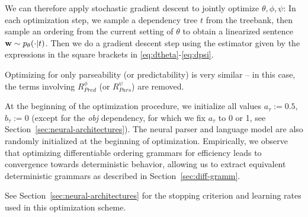 \documentclass[10pt,twoside,lineno]{article}
\DeclareMathOperator{\E}{\mathop{\mathbb{E}}}
\begin{document}
We can therefore apply stochastic gradient descent to jointly optimize $\theta, \phi, \psi$:
In each optimization step, we sample a dependency tree $t$ from the treebank, then sample an ordering from the current setting of $\theta$ to obtain a linearized sentence ${\bf w} \sim p_{\theta}(\cdot|t)$.
Then we %
do a gradient descent step using the estimator given by the expressions in the square brackets in \ref{eq:dtheta}-\ref{eq:dpsi}.


Optimizing for only parseability (or predictability) is very similar -- in this case, the terms involving $R_{Pred}^\phi$ (or $R_{Pars}^\psi$) are removed.


At the beginning of the optimization procedure, we initialize all values $a_\tau := 0.5$, $b_\tau := 0$ (except for the \emph{obj} dependency, for which we fix $a_\tau$ to 0 or 1, see Section~\ref{sec:neural-architectures}).
The neural parser and language model are also randomly initialized at the beginning of optimization.
Empirically, we observe that optimizing differentiable ordering grammars for efficiency leads to convergence towards deterministic behavior, allowing us to extract equivalent deterministic grammars as described in Section~\ref{sec:diff-gramm}.

See Section~\ref{sec:neural-architectures} for the stopping criterion and learning rates used in this optimization scheme.



%
%
\end{document}
